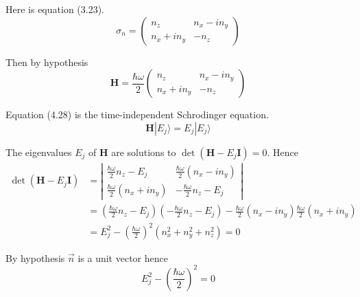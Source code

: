 


\bigskip
Here is equation (3.23).
\begin{equation*}
\sigma_n=\begin{pmatrix}
n_z & n_x-in_y
\\
n_x+in_y & -n_z
\end{pmatrix}
\tag{3.23}
\end{equation*}

Then by hypothesis
\begin{equation*}
\mathbf H=\frac{\hbar\omega}{2}
\begin{pmatrix}
n_z & n_x-in_y
\\
n_x+in_y & -n_z
\end{pmatrix}
\end{equation*}

Equation (4.28) is the time-independent Schrodinger equation.
\begin{equation*}
\mathbf H|E_j\rangle=E_j|E_j\rangle
\tag{4.28}
\end{equation*}

The eigenvalues $E_j$ of $\mathbf H$ are solutions to $\det(\mathbf H-E_j\mathbf I)=0$.
Hence
\begin{align*}
\det(\mathbf H-E_j\mathbf I)&=\left|
\begin{matrix}
\frac{\hbar\omega}{2}n_z-E_j & \frac{\hbar\omega}{2}(n_x-in_y)
\\[1ex]
\frac{\hbar\omega}{2}(n_x+in_y) & -\frac{\hbar\omega}{2}n_z-E_j
\end{matrix}
\right|
\\
&=\left(\frac{\hbar\omega}{2}n_z-E_j\right)\left(-\frac{\hbar\omega}{2}n_z-E_j\right)
-\frac{\hbar\omega}{2}(n_x-in_y)\frac{\hbar\omega}{2}(n_x+in_y)
\\
&=E_j^2-\left(\frac{\hbar\omega}{2}\right)^2\left(n_x^2+n_y^2+n_z^2\right)=0
\end{align*}

By hypothesis $\vec n$ is a unit vector hence
\begin{equation*}
E_j^2-\left(\frac{\hbar\omega}{2}\right)^2=0
\end{equation*}

